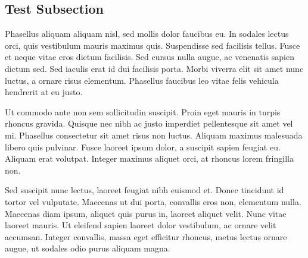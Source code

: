 \subsection{Test Subsection}\label{ssec:test}
Phasellus aliquam aliquam nisl, sed mollis dolor faucibus eu. 
In sodales lectus orci, quis vestibulum mauris maximus quis. 
Suspendisse sed facilisis tellus. 
Fusce et neque vitae eros dictum facilisis. 
Sed cursus nulla augue, ac venenatis sapien dictum sed. 
Sed iaculis erat id dui facilisis porta. 
Morbi viverra elit sit amet nunc luctus, a ornare risus elementum. 
Phasellus faucibus leo vitae felis vehicula hendrerit at eu justo.

Ut commodo ante non sem sollicitudin suscipit. 
Proin eget mauris in turpis rhoncus gravida. 
Quisque nec nibh ac justo imperdiet pellentesque sit amet vel mi. 
Phasellus consectetur sit amet risus non luctus. 
Aliquam maximus malesuada libero quis pulvinar. 
Fusce laoreet ipsum dolor, a suscipit sapien feugiat eu. 
Aliquam erat volutpat. 
Integer maximus aliquet orci, at rhoncus lorem fringilla non. 

Sed suscipit nunc lectus, laoreet feugiat nibh euismod et. 
Donec tincidunt id tortor vel vulputate. 
Maecenas ut dui porta, convallis eros non, elementum nulla. 
Maecenas diam ipsum, aliquet quis purus in, laoreet aliquet velit. 
Nunc vitae laoreet mauris. 
Ut eleifend sapien laoreet dolor vestibulum, ac ornare velit accumsan. 
Integer convallis, massa eget efficitur rhoncus, metus lectus ornare augue, ut sodales odio purus aliquam magna.


